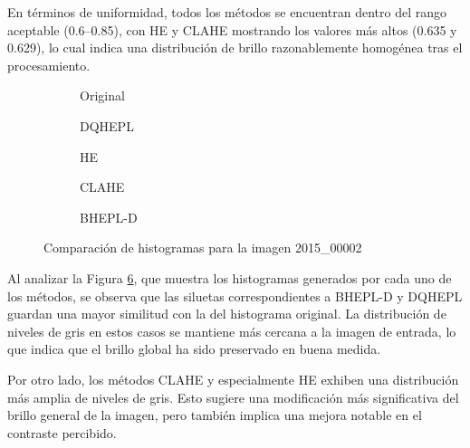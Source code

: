 \documentclass[sigchi]{acmart}
\begin{document}
En términos de uniformidad, todos los métodos se encuentran dentro del rango aceptable
(0.6–0.85), con HE y CLAHE mostrando los valores más altos (0.635 y 0.629), lo cual indica una
distribución de brillo razonablemente homogénea tras el procesamiento.

\begin{figure}[htbp]
	\centering

	\begin{subfigure}[b]{0.45\textwidth}
		\resizebox{\linewidth}{!}{}
		\caption{Original}
		\label{fig:original_1}
	\end{subfigure}
	\hfill
	\begin{subfigure}[b]{0.45\textwidth}
		\resizebox{\linewidth}{!}{}
		\caption{DQHEPL}
		\label{fig:dqhepl_1}
	\end{subfigure}

	\begin{subfigure}[b]{0.45\textwidth}
		\resizebox{\linewidth}{!}{}
		\caption{HE}
		\label{fig:he_1}
	\end{subfigure}
	\hfill
	\begin{subfigure}[b]{0.45\textwidth}
		\resizebox{\linewidth}{!}{}
		\caption{CLAHE}
		\label{fig:clahe_1}
	\end{subfigure}

	\centering
	\begin{subfigure}[b]{0.45\textwidth}
		\resizebox{\linewidth}{!}{}
		\caption{BHEPL-D}
		\label{fig:bhepl_1}
	\end{subfigure}

	\caption{Comparación de histogramas para la imagen 2015\_00002}
	\label{fig:histogramas_1}
\end{figure}

Al analizar la Figura \ref{fig:histogramas_1}, que muestra los histogramas generados por cada
uno de los métodos, se observa que las siluetas correspondientes a BHEPL-D y DQHEPL guardan una
mayor similitud con la del histograma original. La distribución de niveles de gris en estos
casos se mantiene más cercana a la imagen de entrada, lo que indica que el brillo global ha
sido preservado en buena medida.

Por otro lado, los métodos CLAHE y especialmente HE exhiben una distribución más amplia de
niveles de gris. Esto sugiere una modificación más significativa del brillo general de la
imagen, pero también implica una mejora notable en el contraste percibido.
\end{document}
